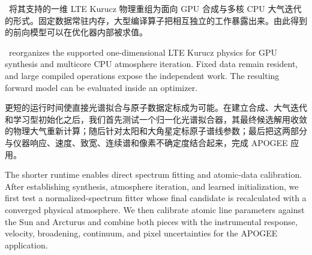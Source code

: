 \paynezero\ 将其支持的一维 LTE Kurucz 物理重组为面向 GPU 合成与多核 CPU 大气迭代的形式。固定数据常驻内存，大型编译算子把相互独立的工作暴露出来。由此得到的前向模型可以在优化器内部被求值。

\begin{EN}
\paynezero\ reorganizes the supported one-dimensional LTE
Kurucz physics for GPU synthesis and multicore CPU atmosphere iteration. Fixed
data remain resident, and large compiled operations expose the independent
work. The resulting forward model can be evaluated inside an optimizer.
\end{EN}

更短的运行时间使直接光谱拟合与原子数据定标成为可能。在建立合成、大气迭代和学习型初始化之后，我们首先测试一个归一化光谱拟合器，其最终候选解用收敛的物理大气重新计算；随后针对太阳和大角星定标原子谱线参数；最后把这两部分与仪器响应、速度、致宽、连续谱和像素不确定度结合起来，完成 APOGEE 应用。

\begin{EN}
The shorter runtime enables direct spectrum fitting and atomic-data
calibration. After establishing synthesis, atmosphere iteration, and learned
initialization, we first test a normalized-spectrum fitter whose final
candidate is recalculated with a converged physical atmosphere. We then
calibrate atomic line parameters against the Sun and Arcturus and combine both
pieces with the instrumental response, velocity, broadening, continuum, and
pixel uncertainties for the APOGEE application.
\end{EN}

